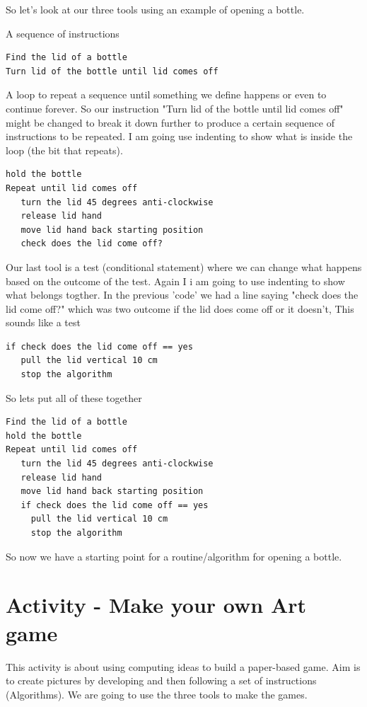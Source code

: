 So let's look at our three tools using an example of opening a bottle.

A sequence of instructions
\begin{lstlisting}
Find the lid of a bottle
Turn lid of the bottle until lid comes off
\end{lstlisting}

A loop to repeat a sequence until something we define happens or even to continue forever. So our instruction "Turn lid of the bottle until lid comes off" might be changed to break it down further to produce a certain sequence of instructions to be repeated. I am going use indenting to show what is inside the loop (the bit that repeats).
\begin{lstlisting}
hold the bottle
Repeat until lid comes off
   turn the lid 45 degrees anti-clockwise
   release lid hand 
   move lid hand back starting position
   check does the lid come off?
\end{lstlisting}

Our last tool is a test (conditional statement) where we can change what happens based on the outcome of the test. Again I i am going to use indenting to show what belongs togther. In the previous 'code' we had a line saying "check does the lid come off?" which was two outcome if the lid does come off or it doesn't, This sounds like a test

\begin{lstlisting}
if check does the lid come off == yes
   pull the lid vertical 10 cm
   stop the algorithm
\end{lstlisting}

So lets put all of these together
\begin{lstlisting}
Find the lid of a bottle
hold the bottle
Repeat until lid comes off
   turn the lid 45 degrees anti-clockwise
   release lid hand 
   move lid hand back starting position
   if check does the lid come off == yes
     pull the lid vertical 10 cm
     stop the algorithm
\end{lstlisting}

So now we have a starting point for a routine/algorithm for opening a bottle. 

\section{Activity - Make your own Art game}
This activity is about using computing ideas to build a paper-based game. Aim is to create pictures by developing and then following a set of instructions (Algorithms). We are going to use the three tools to make the games. 

